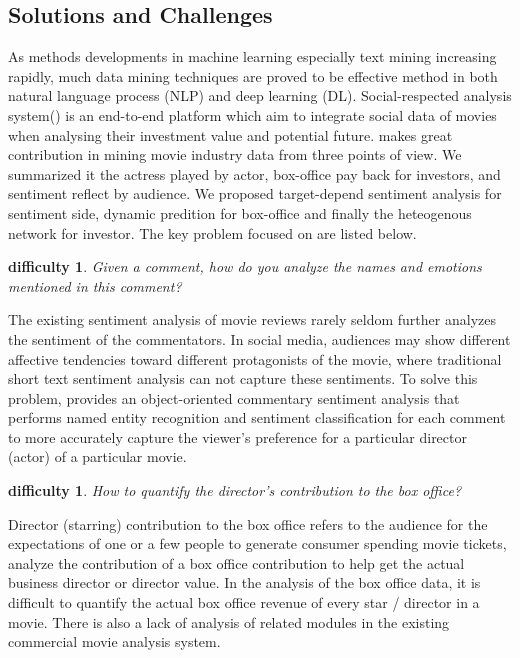 \subsection{Solutions and Challenges}
As methods developments in machine learning especially text mining increasing rapidly, much data mining techniques are proved to be effective method in both natural language process (NLP) and deep learning (DL). Social-respected analysis system(\system) is an end-to-end platform which aim to integrate social data of movies when analysing their investment value and potential future. \system makes great contribution in mining movie industry data from three points of view. We summarized it the actress played by actor, box-office pay back for investors, and sentiment reflect by audience. We proposed target-depend sentiment analysis for sentiment side, dynamic predition for box-office and finally the heteogenous network for investor. The key problem \system focused on are listed below.
\newtheorem{difficulties}[theorem]{difficulty}
\begin{difficulties}
Given a comment, how do you analyze the names and emotions mentioned in this comment? \end{difficulties}
\par The existing sentiment analysis of movie reviews rarely seldom further analyzes the sentiment of the commentators. In social media, audiences may show different affective tendencies toward different protagonists of the movie, where traditional short text sentiment analysis can not capture these sentiments. To solve this problem, \system provides an object-oriented commentary sentiment analysis that performs named entity recognition and sentiment classification for each comment to more accurately capture the viewer's preference for a particular director (actor) of a particular movie.
\begin{difficulties}
How to quantify the director's contribution to the box office?
\end{difficulties}
\par Director (starring) contribution to the box office refers to the audience for the expectations of one or a few people to generate consumer spending movie tickets, analyze the contribution of a box office contribution to help get the actual business director or director value. In the analysis of the box office data, it is difficult to quantify the actual box office revenue of every star / director in a movie. There is also a lack of analysis of related modules in the existing commercial movie analysis system.
